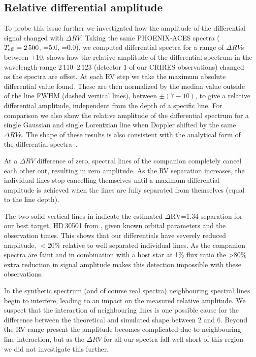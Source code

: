 \subsection{Relative differential amplitude}
To probe this issue further we investigated how the amplitude of the differential signal changed with \(\Delta {RV}\). Taking the same {PHOENIX-ACES} spectra (\(T_{\mathrm{eff}}{}=2\,500\)\K{}, \logg{}=5.0, \feh{}=0.0), we computed differential spectra for a range of \(\Delta {RV}\)s between \(\pm10\)\kmps{}.  shows how the relative amplitude of the differential spectrum in the wavelength range 2\,110--2\,123\nm{} (detector 1 of our {CRIRES} observations) changed as the spectra are offset. At each {RV} step we take the maximum absolute differential value found. These are then normalized by the median value outside of the line {FWHM} (dashed vertical lines), between \(\pm(7-10)\)\kmps{}, to give a relative differential amplitude, independent from the depth of a specific line. For comparison we also show the relative amplitude of the differential spectrum for a single Gaussian and single Lorentzian line when Doppler shifted by the same \(\Delta {RV}\)s. The shape of these results is also consistent with the analytical form of the differential spectra~\citet[][eqn.~A.1]{ferluga_separating_1997}.

At a \(\Delta {RV}\) difference of zero, spectral lines of the companion completely cancel each other out, resulting in zero amplitude. As the {RV} separation increases, the individual lines stop cancelling themselves until a maximum differential amplitude is achieved when the lines are fully separated from themselves (equal to the line depth).

The two solid vertical lines in  indicate the estimated \(\Delta \textrm{RV}\)=1.34\kmps{} separation for our best target, {HD\,30501} from , given known orbital parameters and the observation times. This shows that our differentials have severely reduced amplitude, \(<20\%\) relative to well separated individual lines. As the companion spectra are faint and in combination with a host star at 1\% flux ratio the >80\% extra reduction in signal amplitude makes this detection impossible with these observations.

In the synthetic spectrum (and of course real spectra) neighbouring spectral lines begin to interfere, leading to an impact on the measured relative amplitude. We suspect that the interaction of neighbouring lines is one possible cause for the difference between the theoretical and simulated shape between 2 and 6\kmps{}. Beyond the {RV} range present the amplitude becomes complicated due to neighbouring line interaction, but as the \(\Delta {RV}\) for all our spectra fall well short of this region we did not investigate this further.

